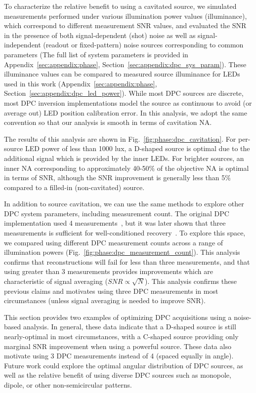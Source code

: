 To characterize the relative benefit to using a cavitated source, we simulated measurements performed under various illumination power values (illuminance), which correspond to different measurement SNR values, and evaluated the SNR in the presence of both signal-dependent (shot) noise as well as signal-independent (readout or fixed-pattern) noise sources corresponding to common parameters (The full list of system parameters is provided in Appendix~\ref{sec:appendix:phase}, Section~\ref{sec:appendix:dpc_sys_param}). These illuminance values can be compared to measured source illuminance for LEDs used in this work (Appendix~\ref{sec:appendix:phase}, Section~\ref{sec:appendix:dpc_led_power}). While most DPC sources are discrete, most DPC inversion implementations model the source as continuous to avoid (or average out) LED position calibration error. In this analysis, we adopt the same convention so that our analysis is smooth in terms of cavitation NA.

The results of this analysis are shown in Fig.~\ref{fig:phase:dpc_cavitation}. For per-source LED power of less than 1000 lux, a D-shaped source is optimal due to the additional signal which is provided by the inner LEDs. For brighter sources, an inner NA corresponding to approximately 40-50\% of the objective NA is optimal in terms of SNR, although the SNR improvement is generally less than 5\% compared to a filled-in (non-cavitated) source.

In addition to source cavitation, we can use the same methods to explore other DPC system parameters, including measurement count. The original DPC implementation used 4 measurements~\cite{tian2015quantitative}, but it was later shown that three measurements is sufficient for well-conditioned recovery~\cite{PhillipsChen17cDPC}. To explore this space, we compared using different DPC measurement counts across a range of illumination powers (Fig.~\ref{fig:phase:dpc_measurement_count}). This analysis confirms that reconstructions will fail for less than three measurements, and that using greater than 3 measurements provides improvements which are characteristic of signal averaging ($SNR \propto \sqrt{N}$). This analysis confirms these previous claims and motivates using three DPC measurements in most circumstances (unless signal averaging is needed to improve SNR).

This section provides two examples of optimizing DPC acquisitions using a noise-based analysis. In general, these data indicate that a D-shaped source is still nearly-optimal in most circumstances, with a C-shaped source providing only marginal SNR improvement when using a powerful source. These data also motivate using 3 DPC measurements instead of 4 (spaced equally in angle). Future work could explore the optimal angular distribution of DPC sources, as well as the relative benefit of using diverse DPC sources such as monopole, dipole, or other non-semicircular patterns.

